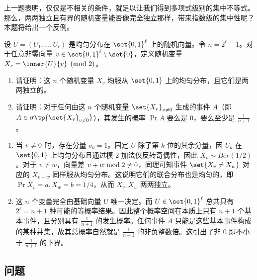 \begin{exercise}
上一题表明，仅仅是不相关的条件，就足以让我们得到多项式级别的集中不等式。那么，两两独立且有界的随机变量能否像完全独立那样，带来指数级的集中性呢？本题将给出一个反例。

设 $U = (U_1, \dots, U_\ell)$ 是均匀分布在 $\set{0, 1}^\ell$ 上的随机向量。令 $n = 2^\ell - 1$。对于任意非零向量 $v \in \set{0, 1}^\ell \setminus \set{\*0}$，定义随机变量 $X_v = \inner{U}{v} \pmod 2$。
\begin{enumerate}
    \item 请证明：这 $n$ 个随机变量 $X_v$ 均服从 $\set{0, 1}$ 上的均匀分布，且它们是两两独立的。
    \item 请证明：对于任何由这 $n$ 个随机变量 $\set{X_v}_{v \neq \*0}$ 生成的事件 $A$（即 $A \in \sigma\tp{\set{X_v}_{v \neq \*0}}$），其发生的概率 $\Pr{A}$ 要么是 $0$，要么至少是 $\frac{1}{n+1}$。
\end{enumerate}
\end{exercise}
\begin{solution}
    \begin{enumerate}
        \item 当 $v \neq \*0$ 时，存在分量 $v_k = 1$。固定 $U$ 除了第 $k$ 位的其余分量，因 $U_k$ 在 $\set{0, 1}$ 上均匀分布且通过模 2 加法仅反转奇偶性，因此 $X_v \sim \!{Ber}(1/2)$。对于 $v \neq w$，向量差 $v+w \bmod 2 \neq \*0$，同理可知事件 $\set{X_v \neq X_w}$ 对应的 $X_{v+w}$ 同样服从均匀分布。这说明它们的联合分布也是均匀的，即 $\Pr{X_v=a, X_w=b} = 1/4$，从而 $X_v, X_w$ 两两独立。
        \item 这 $n$ 个变量完全由基础向量 $U$ 唯一决定。而 $U \in \set{0,1}^\ell$ 总共只有 $2^\ell = n+1$ 种可能的等概率结果。因此整个概率空间在本质上只有 $n+1$ 个基本事件，且分别具有 $\frac{1}{n+1}$ 的发生概率。任何事件 $A$ 只能是这些基本事件构成的某种并集，故其总概率自然就是 $\frac{1}{n+1}$ 的非负整数倍。这引出了非 $0$ 即不小于 $\frac{1}{n+1}$ 的下界。
    \end{enumerate}
\end{solution}

\subsection*{问题}

